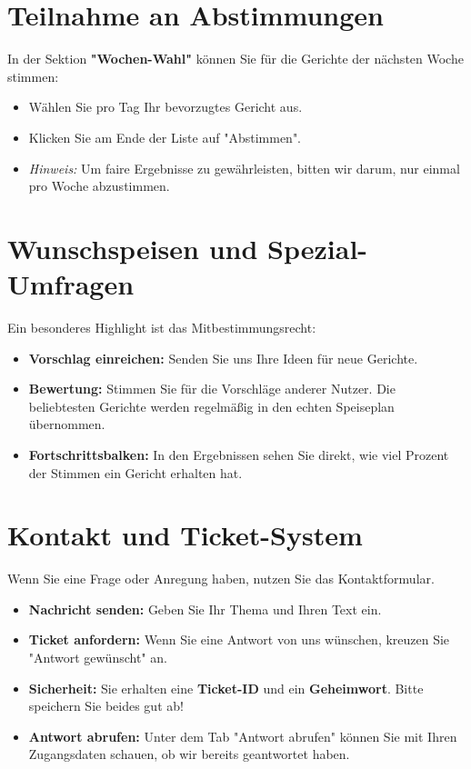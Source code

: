 \documentclass[12pt,a4paper]{article}
\begin{document}
\section{Teilnahme an Abstimmungen}
In der Sektion \textbf{"Wochen-Wahl"} können Sie für die Gerichte der nächsten Woche stimmen:
\begin{itemize}
    \item Wählen Sie pro Tag Ihr bevorzugtes Gericht aus.
    \item Klicken Sie am Ende der Liste auf "Abstimmen".
    \item \textit{Hinweis:} Um faire Ergebnisse zu gewährleisten, bitten wir darum, nur einmal pro Woche abzustimmen.
\end{itemize}

\section{Wunschspeisen und Spezial-Umfragen}
Ein besonderes Highlight ist das Mitbestimmungsrecht:
\begin{itemize}
    \item \textbf{Vorschlag einreichen:} Senden Sie uns Ihre Ideen für neue Gerichte.
    \item \textbf{Bewertung:} Stimmen Sie für die Vorschläge anderer Nutzer. Die beliebtesten Gerichte werden regelmäßig in den echten Speiseplan übernommen.
    \item \textbf{Fortschrittsbalken:} In den Ergebnissen sehen Sie direkt, wie viel Prozent der Stimmen ein Gericht erhalten hat.
\end{itemize}

\section{Kontakt und Ticket-System}
Wenn Sie eine Frage oder Anregung haben, nutzen Sie das Kontaktformular.
\begin{itemize}
    \item \textbf{Nachricht senden:} Geben Sie Ihr Thema und Ihren Text ein.
    \item \textbf{Ticket anfordern:} Wenn Sie eine Antwort von uns wünschen, kreuzen Sie "Antwort gewünscht" an.
    \item \textbf{Sicherheit:} Sie erhalten eine \textbf{Ticket-ID} und ein \textbf{Geheimwort}. Bitte speichern Sie beides gut ab!
    \item \textbf{Antwort abrufen:} Unter dem Tab "Antwort abrufen" können Sie mit Ihren Zugangsdaten schauen, ob wir bereits geantwortet haben.
\end{itemize}
\end{document}
